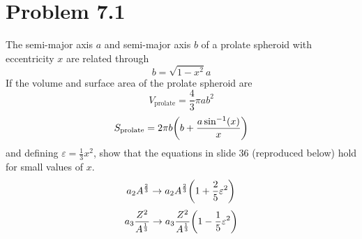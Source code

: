 \documentclass[12pt,a4paper]{article}
\begin{document}
	\section*{
		Problem 7.1
	}
	\begin{problem}
		The semi-major axis $a$ and semi-major axis $b$ of a prolate spheroid
		with eccentricity $x$ are related through
		\begin{equation}
			\label{eq:prolate-relation}
			b = \sqrt{1-x^2}a
		\end{equation}
		If the volume and surface area of the prolate spheroid are
		\begin{equation}
			\label{eq:v-prolate}
			V_\text{prolate}
			=
			\frac{4}{3}\pi ab^2 
		\end{equation}
		\begin{equation}
			\label{eq:s-prolate}
			S_\text{prolate}
		    =
			2\pi b \pqty{
				b + \frac{
					a \sin\inv(x)
				}{x} 
			}
		\end{equation}
		and defining $\displaystyle \varepsilon =\frac{1}{3} x^2$, show that the equations in slide
		36 (reproduced below) hold for small values of $x$.
		\begin{equation}
			\label{eq:a2-term}
			a_2 A^{\frac{2}{3}} \to a_2 A^\frac{2}{3} \pqty{
				1 + \frac{2}{5} \varepsilon^2
			} 
		\end{equation}
		\begin{equation}
			\label{eq:a3-term}
			a_3 \frac{Z^2}{A^\frac{1}{3}} 
			\to
			a_3 \frac{Z^2}{A^\frac{1}{3}} 
			\pqty{
				1 - \frac{1}{5}
				\varepsilon^{2}
			}
		\end{equation}
	\end{problem}
\end{document}
